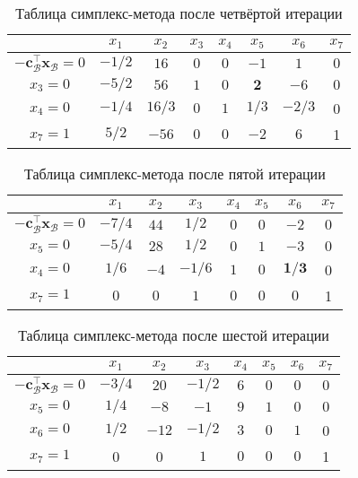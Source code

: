 \documentclass[12pt]{article}
\newcommand{\bx}{\mathbf{x}}
\begin{document}
\begin{table}[!ht]
\centering
\caption{Таблица симплекс-метода после четвёртой итерации}
\begin{tabular}{|c|ccccccc|}
\hline
& $x_1$ & $x_2$ & $x_3$ & $x_4$ & $x_5$ & $x_6$ & $x_7$\\
\hline
$-\mathbf{c}_{\mathcal{B}}^{\top}\bx_{\mathcal{B}} = 0$ & $-1/2$ & $16$ & $0$ & $0$ & $-1$ & $1$ & $0$ \\
\hline
$x_3 = 0$ & $-5/2$ & $56$ & $1$ & $0$ & $\mathbf{2}$ & $-6$ & $0$ \\
$x_4 = 0$ & $-1/4$ & $16/3$ & $0$ & $1$ & $1/3$ & $-2/3$ & 0 \\
$x_7 = 1$ & $5/2$ & $-56$ & $0$ & $0$ & $-2$ & $6$ & 1 \\
\hline
\end{tabular}
\label{tab::simplex_24}
\end{table}

\begin{table}[!ht]
\centering
\caption{Таблица симплекс-метода после пятой итерации}
\begin{tabular}{|c|ccccccc|}
\hline
& $x_1$ & $x_2$ & $x_3$ & $x_4$ & $x_5$ & $x_6$ & $x_7$\\
\hline
$-\mathbf{c}_{\mathcal{B}}^{\top}\bx_{\mathcal{B}} = 0$ & $-7/4$ & $44$ & $1/2$ & $0$ & $0$ & $-2$ & $0$ \\
\hline
$x_5 = 0$ & $-5/4$ & $28$ & $1/2$ & $0$ & $1$ & $-3$ & $0$ \\
$x_4 = 0$ & $1/6$ & $-4$ & $-1/6$ & $1$ & $0$ & $\mathbf{1/3}$ & 0 \\
$x_7 = 1$ & $0$ & $0$ & $1$ & $0$ & $0$ & $0$ & 1 \\
\hline
\end{tabular}
\label{tab::simplex_25}
\end{table}

\begin{table}[!ht]
\centering
\caption{Таблица симплекс-метода после шестой итерации}
\begin{tabular}{|c|ccccccc|}
\hline
& $x_1$ & $x_2$ & $x_3$ & $x_4$ & $x_5$ & $x_6$ & $x_7$\\
\hline
$-\mathbf{c}_{\mathcal{B}}^{\top}\bx_{\mathcal{B}} = 0$ & $-3/4$ & $20$ & $-1/2$ & $6$ & $0$ & $0$ & $0$ \\
\hline
$x_5 = 0$ & $1/4$ & $-8$ & $-1$ & $9$ & $1$ & $0$ & $0$ \\
$x_6 = 0$ & $1/2$ & $-12$ & $-1/2$ & $3$ & $0$ & $1$ & 0 \\
$x_7 = 1$ & 0 & 0 & $1$ & $0$ & $0$ & $0$ & 1 \\
\hline
\end{tabular}
\label{tab::simplex_26}
\end{table}
\end{document}
